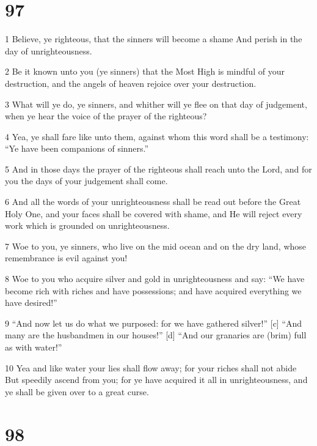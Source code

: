 \chapter{97}

\par 1 Believe, ye righteous, that the sinners will become a shame And perish in the day of unrighteousness.
\par 2 Be it known unto you (ye sinners) that the Most High is mindful of your destruction, and the angels of heaven rejoice over your destruction.
\par 3 What will ye do, ye sinners, and whither will ye flee on that day of judgement, when ye hear the voice of the prayer of the righteous?
\par 4 Yea, ye shall fare like unto them, against whom this word shall be a testimony: “Ye have been companions of sinners.”
\par 5 And in those days the prayer of the righteous shall reach unto the Lord, and for you the days of your judgement shall come.
\par 6 And all the words of your unrighteousness shall be read out before the Great Holy One, and your faces shall be covered with shame, and He will reject every work which is grounded on unrighteousness.
\par 7 Woe to you, ye sinners, who live on the mid ocean and on the dry land, whose remembrance is evil against you!
\par 8 Woe to you who acquire silver and gold in unrighteousness and say: “We have become rich with riches and have possessions; and have acquired everything we have desired!”
\par 9 “And now let us do what we purposed: for we have gathered silver!” [c] “And many are the husbandmen in our houses!” [d] “And our granaries are (brim) full as with water!”
\par 10 Yea and like water your lies shall flow away; for your riches shall not abide But speedily ascend from you; for ye have acquired it all in unrighteousness, and ye shall be given over to a great curse.

\chapter{98}

